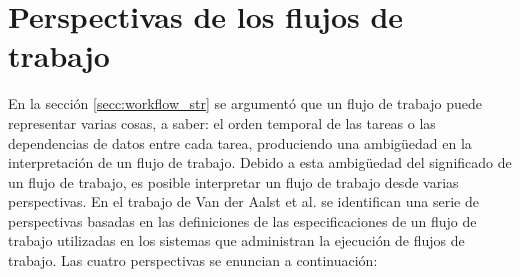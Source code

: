 \section{Perspectivas de los flujos de trabajo}
En la sección \ref{secc:workflow_str} se argumentó que un flujo de trabajo puede representar varias cosas, a saber: el orden temporal de las tareas o las dependencias de datos entre cada tarea, produciendo una ambigüedad en la interpretación de un flujo de trabajo. Debido a esta ambigüedad del significado de un flujo de trabajo, es posible interpretar un flujo de trabajo desde varias perspectivas. En el trabajo de Van der Aalst et al. \cite{van2003workflow} se identifican una serie de perspectivas basadas en las definiciones de las especificaciones de un flujo de trabajo utilizadas en los sistemas que administran la ejecución de flujos de trabajo. Las cuatro perspectivas se enuncian a continuación:

